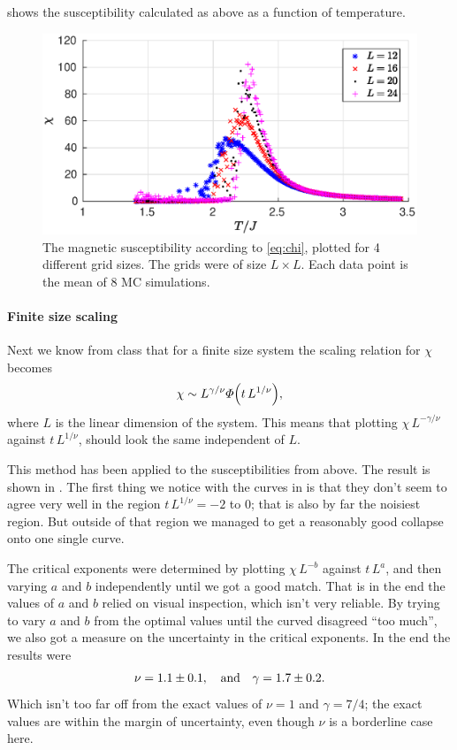 \documentclass[11pt,letter, swedish, english
]{article}
\begin{document}
 shows the susceptibility calculated as above as a
function of temperature. 


\begin{figure}
\centering
\includegraphics[width=.7\textwidth]{chi_L-16--24_Nsteps-2048_Nmean-16.eps}
\caption{The magnetic susceptibility according to \eqref{eq:chi},
  plotted for 4 different grid sizes. The grids were of size 
  $L\times L$. Each data point is the mean of 8 MC simulations.}
\label{fig:chi1}
\end{figure}

\paragraph{Finite size scaling}
Next we know from class that for a finite size system the scaling
relation for $\chi$ becomes
\begin{equation}
\chi\sim L^{\gamma/\nu}\varPhi\qty(t\,L^{1/\nu}),
\end{equation}
where $L$ is the linear dimension of the system. This means that
plotting $\chi\,L^{-\gamma/\nu}$ against $t\,L^{1/\nu}$, should look
the same independent of $L$. 

This method has been applied to the susceptibilities from above. The
result is shown in . The first thing we
notice with the curves in  is that they
don't seem to agree very well in the region $t\,L^{1/\nu}=-2$ to $0$;
that is also by far the noisiest region. But outside of that region we
managed to get a reasonably good collapse onto one single curve. 

The critical exponents were determined by plotting $\chi\,L^{-b}$ 
against $t\,L^{a}$, and then varying $a$ and $b$ independently until
we got a good match. That is in the end the values of $a$ and $b$
relied on visual inspection, which isn't very reliable. By trying to
vary $a$ and $b$ from the optimal values until the curved disagreed
``too much'', we also got a measure on the uncertainty in the critical
exponents. In the end the results were
\begin{equation*}
\nu = 1.1\pm0.1\qcomma\text{and} \quad
\gamma = 1.7\pm0.2.
\end{equation*}
Which isn't too far off from the exact values of $\nu=1$ and
$\gamma=7/4$; the exact values are within the margin of uncertainty,
even though $\nu$ is a borderline case here. 
\end{document}
